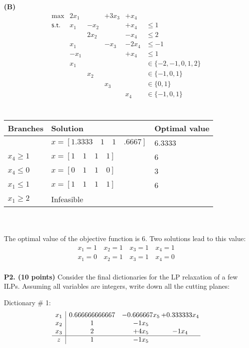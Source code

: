 \documentclass[11pt]{article}
\begin{document}
\noindent\textbf{(B)} 
\[ \begin{array}{rlllll}
\max & 2 x_1 &  & + 3 x_3 & + x_4 \\
\mathsf{s.t.}  & x_1 & - x_2 &  & + x_4 & \leq 1 \\
&  & 2 x_2 &  & - x_4 & \leq 2 \\
& x_1 &  & - x_3 & - 2 x_4 & \leq -1 \\
& -x_1 & &   & + x_4 & \leq 1\\
& x_1 &  &   &    & \in \{ -2,-1, 0, 1,2 \} \\
&   & x_2 &  &    & \in \{ -1, 0, 1 \} \\
&   &     & x_3 & & \in \{ 0, 1\} \\
&   &     &    & x_4 & \in \{ -1, 0, 1\} \\
\end{array}\]
\\
\begin{tabular}{|l|l|l|}
\hline
Branches & Solution & Optimal value \\ \hline
& $x = [1.3333\quad1\quad1\quad.6667]$ & 6.3333 \\ \hline
$x_4 \geq 1$ & $x = [1\quad1\quad1\quad1]$ & 6 \\ \hline
$x_4 \leq 0$ & $x = [0\quad1\quad1\quad0]$ & 3 \\ \hline
$x_1 \leq 1$ & $x = [1\quad1\quad1\quad1]$ & 6 \\ \hline
$x_1 \geq 2$ & Infeasible & \\ \hline
\end{tabular}
\\ \\
The optimal value of the objective function is 6.  Two solutions lead to this value:
\begin{align*}
x_1 = 1 \quad x_2 = 1 \quad x_3 = 1 \quad x_4 = 1 \\
x_1 = 0 \quad x_2 = 1 \quad x_3 = 1 \quad x_4 = 0 \\
\end{align*}




\noindent\textbf{P2. (10 points)}  Consider the final dictionaries for 
the LP relaxation of a few ILPs.  Assuming all variables are integers,
write down all the cutting planes:

Dictionary \# 1:
\[\begin{array}{c| c c@{\hskip 2pt} c@{\hskip 2pt} }
 x_{1}   &  0.666666666667 & -0.666667 x_{5} & + 0.333333 x_{4}\\
 x_{2}   &  1 & -1  x_{5} &   \\
 x_{3}   &  2 & + 4  x_{5} & -1  x_{4}\\
\hline
z    &  1 & -1  x_{5} &   \\
\end{array}\]
\end{document}
